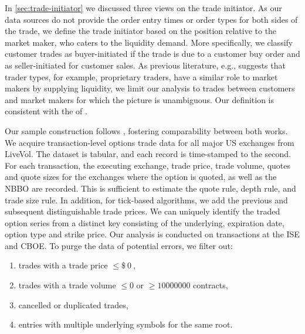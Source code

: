In \cref{sec:trade-initiator} we discussed three views on the trade initiator. As our data sources do not provide the order entry times or order types for both sides of the trade, we define the trade initiator based on the position relative to the market maker, who caters to the liquidity demand. More specifically, we classify customer trades as buyer-initiated if the trade is due to a customer buy order and as seller-initiated for customer sales. As previous literature, e.g., \textcite[][4276]{garleanuDemandBasedOptionPricing2009} suggests that trader types, for example, proprietary traders, have a similar role to market makers by supplying liquidity, we limit our analysis to trades between customers and market makers for which the picture is unambiguous. Our definition is consistent with the of \textcite[][8]{grauerOptionTradeClassification2022}.



Our sample construction follows \textcite[][7--9]{grauerOptionTradeClassification2022}, fostering comparability between both works. We acquire transaction-level options trade data for all major US exchanges from LiveVol. The dataset is tabular, and each record is time-stamped to the second. For each transaction, the executing exchange, trade price, trade volume, quotes and quote sizes for the exchanges where the option is quoted, as well as the \gls{NBBO} are recorded. This is sufficient to estimate the quote rule, depth rule, and trade size rule. In addition, for tick-based algorithms, we add the previous and subsequent distinguishable trade prices. We can uniquely identify the traded option series from a distinct key consisting of the underlying, expiration date, option type and strike price. Our analysis is conducted on transactions at the \gls{ISE} and \gls{CBOE}. To purge the data of potential errors, we filter out:
\begin{enumerate}[label=(\roman*),noitemsep]
    \item trades with a trade price $\leq \SI{0}[\$]{}$,
    \item trades with a trade volume $\leq 0$ or $\ge \num{10000000}$ contracts,
    \item cancelled or duplicated trades,
    \item entries with multiple underlying symbols for the same root.
\end{enumerate}

